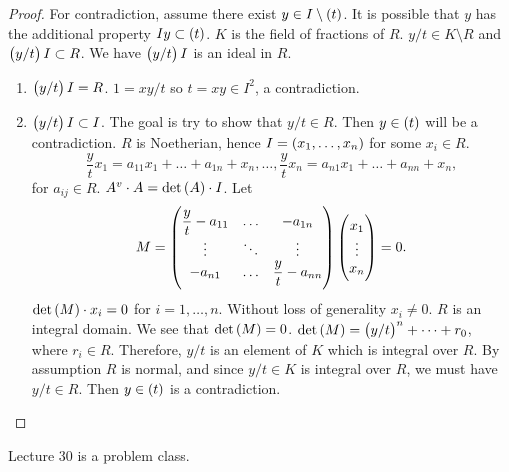 \begin{proof}
For contradiction, assume there exist $ y \in I \setminus \br{t} $. It is possible that $ y $ has the additional property $ Iy \subset \br{t} $. $ K $ is the field of fractions of $ R $. $ y / t \in K \setminus R $ and $ \br{y / t}I \subset R $. We have $ \br{y / t}I $ is an ideal in $ R $.
\begin{enumerate}
\item $ \br{y / t}I = R $. $ 1 = xy / t $ so $ t = xy \in I^2 $, a contradiction.
\item $ \br{y / t}I \subset I $. The goal is try to show that $ y / t \in R $. Then $ y \in \br{t} $ will be a contradiction. $ R $ is Noetherian, hence $ I = \br{x_1, \dots, x_n} $ for some $ x_i \in R $.
$$ \dfrac{y}{t}x_1 = a_{11}x_1 + \dots + a_{1n} + x_n, \dots, \dfrac{y}{t}x_n = a_{n1}x_1 + \dots + a_{nn} + x_n, $$
for $ a_{ij} \in R $. $ A^v \cdot A = \det\br{A} \cdot I $. Let
$$ M = \threebythree{\dfrac{y}{t} - a_{11}}{\dots}{-a_{1n}}{\vdots}{\ddots}{\vdots}{-a_{n1}}{\dots}{\dfrac{y}{t} - a_{nn}}\threebyone{x_1}{\vdots}{x_n} = 0. $$
$ \det\br{M} \cdot x_i = 0 $ for $ i = 1, \dots, n $. Without loss of generality $ x_i \ne 0 $. $ R $ is an integral domain. We see that $ \det\br{M} = 0 $. $ \det\br{M} = \br{y / t}^n + \dots + r_0 $, where $ r_i \in R $. Therefore, $ y / t $ is an element of $ K $ which is integral over $ R $. By assumption $ R $ is normal, and since $ y / t \in K $ is integral over $ R $, we must have $ y / t \in R $. Then $ y \in \br{t} $ is a contradiction.
\end{enumerate}
\end{proof}


Lecture 30 is a problem class.

